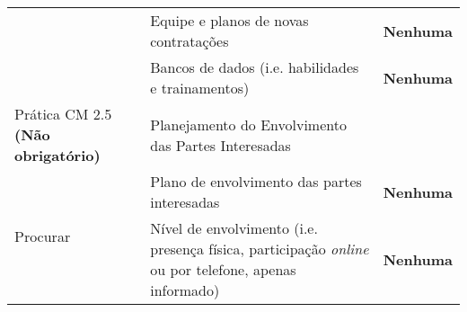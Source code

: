 \begin{longtable}{|p{2cm}|p{7cm}|p{7cm}|}
  \cline{2-3} & Equipe e planos de novas contratações &\textbf{Nenhuma} \\
  \cline{2-3} & Bancos de dados (i.e. habilidades e trainamentos) &\textbf{Nenhuma} \\
  \hline \cellcolor[gray]{0.9} Prática CM 2.5 \textbf{(Não
    obrigatório)} &
  \cellcolor[gray]{0.9} Planejamento do Envolvimento das Partes Interesadas & \\
  \hline \multirow{2}{*}{Procurar} & Plano de envolvimento das partes
  interesadas & \textbf{Nenhuma} \\
  \cline{2-3} & Nível de envolvimento (i.e. presença física,
  participação
  \textit{online} ou por telefone, apenas informado) & \textbf{Nenhuma} \\
  \hline
\end{longtable}

